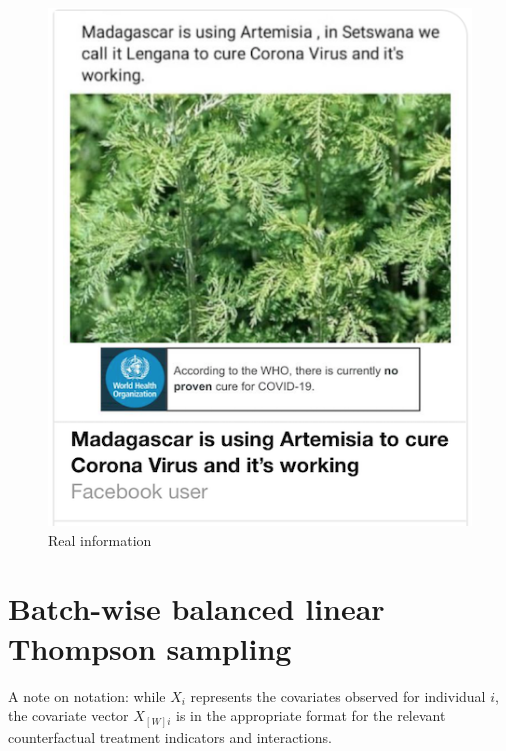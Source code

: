 \documentclass[letterpaper, 12pt, parskip=full,]{scrartcl}
\begin{document}
\begin{figure}[htb]
\begin{minipage}{0.45\textwidth}
        \includegraphics[width=\textwidth]{treat_realinfo.png} 
        \caption*{Real information}
    \end{minipage}
\end{figure}

\FloatBarrier
\section{Batch-wise balanced linear Thompson sampling}\label{appendix:agent}

A note on notation: while $X_i$ represents the covariates observed for individual $i$, the covariate vector $X_{[W]i}$ is in the appropriate format for the relevant counterfactual treatment indicators and interactions.
\end{document}
